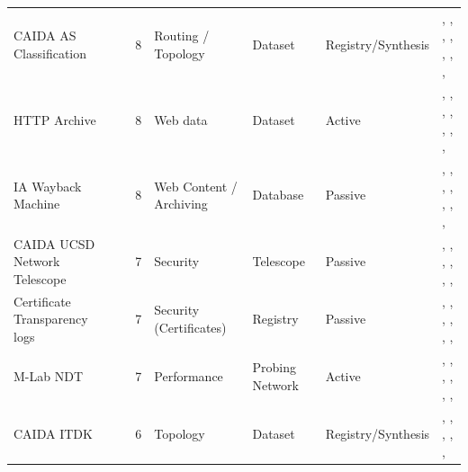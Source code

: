 \documentclass[11pt,a4paper]{article}
\begin{document}
\begin{longtable}{@{}p{}p{}p{}p{}p{}p{}p{}@{}}
CAIDA AS Classification & \cite{caidaasclassification} & 8 & Routing / Topology & Dataset & Registry/Synthesis & \cite{10.1145/3618257.3624811}, \cite{10.1007/978-3-030-72582-2_25}, \cite{10.1007/978-3-031-28486-1_4}, \cite{10.1007/978-3-031-28486-1_16}, \cite{10.1007/978-3-031-85960-1_18}, \cite{10.1145/3777912.3839831}, \cite{10.1007/978-3-032-18268-5_5}, \cite{10.1145/3777912.3839828} \\
HTTP Archive & \cite{httparchive} & 8 & Web data & Dataset & Active & \cite{10.1145/3618257.3624836}, \cite{10.1145/3487552.3487832}, \cite{10.1007/978-3-030-72582-2_5}, \cite{10.1007/978-3-030-72582-2_26}, \cite{10.1007/978-3-031-85960-1_8}, \cite{10.1007/978-3-032-18268-5_13}, \cite{10.1145/3777912.3839817}, \cite{10.1145/3777912.3839792} \\
IA Wayback Machine & \cite{wayback-machine} & 8 & Web Content / Archiving & Database & Passive & \cite{10.1145/3730567.3764507}, \cite{10.1145/3618257.3624832}, \cite{10.1145/3517745.3561451}, \cite{10.1145/3487552.3487816}, \cite{10.1007/978-3-030-98785-5_19}, \cite{10.1145/3777912.3809151}, \cite{10.1145/3777912.3839806}, \cite{10.1145/3777912.3809147} \\
CAIDA UCSD Network Telescope & \cite{caidaucsdnt} & 7 & Security & Telescope & Passive & \cite{10.1145/3646547.3688426}, \cite{10.1145/3646547.3688451}, \cite{10.1145/3517745.3561458}, \cite{10.1145/3487552.3487833}, \cite{10.1145/3487552.3487840}, \cite{10.1145/3777912.3839790}, \cite{10.1007/978-3-032-18268-5_14} \\
Certificate Transparency logs & \cite{ct_logs} & 7 & Security (Certificates) & Registry & Passive & \cite{10.1145/3517745.3561440}, \cite{10.1145/3517745.3561423}, \cite{10.1145/3517745.3561434}, \cite{10.1007/978-3-030-72582-2_17}, \cite{10.1145/3777912.3809146}, \cite{10.1145/3777912.3839803}, \cite{10.1145/3777912.3809148} \\
M-Lab NDT & \cite{mlabndt} & 7 & Performance & Probing Network & Active & \cite{10.1145/3646547.3689007}, \cite{10.1145/3646547.3688441}, \cite{10.1145/3646547.3688411}, \cite{10.1145/3618257.3624828}, \cite{10.1145/3618257.3624831}, \cite{10.1145/3517745.3561449}, \cite{10.1145/3777912.3839831} \\
CAIDA ITDK & \cite{caida_itdk} & 6 & Topology & Dataset & Registry/Synthesis & \cite{10.1145/3618257.3624818}, \cite{10.1145/3517745.3561422}, \cite{10.1145/3487552.3487848}, \cite{10.1007/978-3-031-85960-1_4}, \cite{10.1145/3777912.3839831}, \cite{10.1145/3777912.3839791} \\

\end{longtable}
\end{document}
